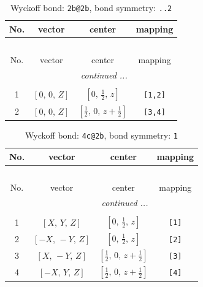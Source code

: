 \documentclass[fleqn,8pt]{jsarticle}
\begin{document}
\renewcommand{\arraystretch}{1.2}
\begin{longtable}{cccc}
\caption{Wyckoff bond: {\tt 2b@2b}, bond symmetry: {\tt ..2}}
 \\
 \hline \hline
No. & vector & center & mapping \\ \hline \endfirsthead

\multicolumn{3}{l}{\tablename\ \thetable{}} \\
 \hline \hline
No. & vector & center & mapping \\ \hline \endhead

 \hline \hline
\multicolumn{3}{r}{\footnotesize\it continued ...} \\ \endfoot

 \hline \hline
\multicolumn{3}{r}{} \\ \endlastfoot

1 & $\left[ 0,\, 0,\, Z \right]$ & $\left[ 0,\, \frac{1}{2},\, z \right]$ & {\tt [1,2]} \\ \hline
2 & $\left[ 0,\, 0,\, Z \right]$ & $\left[ \frac{1}{2},\, 0,\, z + \frac{1}{2} \right]$ & {\tt [3,4]} \\
\end{longtable}
\renewcommand{\arraystretch}{1.2}
\begin{longtable}{cccc}
\caption{Wyckoff bond: {\tt 4c@2b}, bond symmetry: {\tt 1}}
 \\
 \hline \hline
No. & vector & center & mapping \\ \hline \endfirsthead

\multicolumn{3}{l}{\tablename\ \thetable{}} \\
 \hline \hline
No. & vector & center & mapping \\ \hline \endhead

 \hline \hline
\multicolumn{3}{r}{\footnotesize\it continued ...} \\ \endfoot

 \hline \hline
\multicolumn{3}{r}{} \\ \endlastfoot

1 & $\left[ X,\, Y,\, Z \right]$ & $\left[ 0,\, \frac{1}{2},\, z \right]$ & {\tt [1]} \\ \hline
2 & $\left[ - X,\, - Y,\, Z \right]$ & $\left[ 0,\, \frac{1}{2},\, z \right]$ & {\tt [2]} \\ \hline
3 & $\left[ X,\, - Y,\, Z \right]$ & $\left[ \frac{1}{2},\, 0,\, z + \frac{1}{2} \right]$ & {\tt [3]} \\ \hline
4 & $\left[ - X,\, Y,\, Z \right]$ & $\left[ \frac{1}{2},\, 0,\, z + \frac{1}{2} \right]$ & {\tt [4]} \\
\end{longtable}
\end{document}
